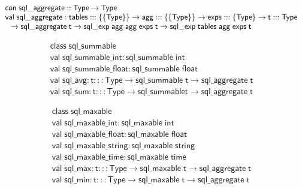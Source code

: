 \documentclass{article}
\newcommand{\mt}[1]{\mathsf{#1}}
\begin{document}
$$\begin{array}{l}
  \mt{con} \; \mt{sql\_aggregate} :: \mt{Type} \to \mt{Type} \\
  \mt{val} \; \mt{sql\_aggregate} : \mt{tables} ::: \{\{\mt{Type}\}\} \to \mt{agg} ::: \{\{\mt{Type}\}\} \to \mt{exps} ::: \{\mt{Type}\} \to \mt{t} ::: \mt{Type} \\
  \hspace{.1in} \to \mt{sql\_aggregate} \; \mt{t} \to \mt{sql\_exp} \; \mt{agg} \; \mt{agg} \; \mt{exps} \; \mt{t} \to \mt{sql\_exp} \; \mt{tables} \; \mt{agg} \; \mt{exps} \; \mt{t}
\end{array}$$
 
$$\begin{array}{l}
  \mt{class} \; \mt{sql\_summable} \\
  \mt{val} \; \mt{sql\_summable\_int} : \mt{sql\_summable} \; \mt{int} \\
  \mt{val} \; \mt{sql\_summable\_float} : \mt{sql\_summable} \; \mt{float} \\
  \mt{val} \; \mt{sql\_avg} : \mt{t} ::: \mt{Type} \to \mt{sql\_summable} \; \mt{t} \to \mt{sql\_aggregate} \; \mt{t} \\
  \mt{val} \; \mt{sql\_sum} : \mt{t} ::: \mt{Type} \to \mt{sql\_summable} \mt{t} \to \mt{sql\_aggregate} \; \mt{t}
\end{array}$$

$$\begin{array}{l}
  \mt{class} \; \mt{sql\_maxable} \\
  \mt{val} \; \mt{sql\_maxable\_int} : \mt{sql\_maxable} \; \mt{int} \\
  \mt{val} \; \mt{sql\_maxable\_float} : \mt{sql\_maxable} \; \mt{float} \\
  \mt{val} \; \mt{sql\_maxable\_string} : \mt{sql\_maxable} \; \mt{string} \\
  \mt{val} \; \mt{sql\_maxable\_time} : \mt{sql\_maxable} \; \mt{time} \\
  \mt{val} \; \mt{sql\_max} : \mt{t} ::: \mt{Type} \to \mt{sql\_maxable} \; \mt{t} \to \mt{sql\_aggregate} \; \mt{t} \\
  \mt{val} \; \mt{sql\_min} : \mt{t} ::: \mt{Type} \to \mt{sql\_maxable} \; \mt{t} \to \mt{sql\_aggregate} \; \mt{t}
\end{array}$$
\end{document}
